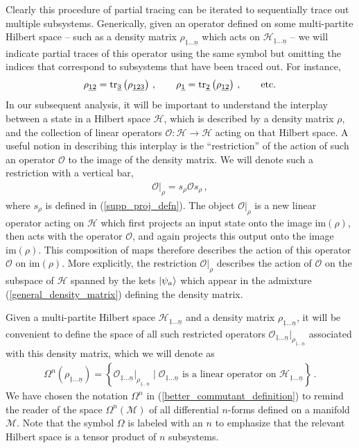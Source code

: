 \documentclass[12pt]{article}
\newcommand{\ul}[1]{{\underline{#1}}}
\newcommand{\im}{\mathrm{im}}
\numberwithin{equation}{section}
\newcommand{\Honeton}{{\mathcal{H}_{\ul{1} \ldots \ul{n}}}}
\begin{document}
Clearly this procedure of partial tracing can be iterated to sequentially trace out multiple subsystems. Generically, given an operator defined on some multi-partite Hilbert space -- such as a density matrix $\rho_{\ul{1} \ldots \ul{n}}$ which acts on $\mathcal{H}_{\ul{1} \ldots \ul{n}}$ -- we will indicate partial traces of this operator using the same symbol but omitting the indices that correspond to subsystems that have been traced out. For instance,
%
\begin{align}
    \rho_{\ul{1} \ul{2}} = \tr_{\ul{3}} \left( \rho_{\ul{1} \ul{2} \ul{3}} \right) \, , \qquad \rho_{\ul{1}} = \tr_{\ul{2}} \left(  \rho_{\ul{1} \ul{2}} \right) \, , \qquad \text{etc.}
\end{align}
%
In our subsequent analysis, it will be important to understand the interplay between a state in a Hilbert space $\mathcal{H}$, which is described by a density matrix $\rho$, and the collection of linear operators $\mathcal{O} : \mathcal{H} \to \mathcal{H}$ acting on that Hilbert space. A useful notion in describing this interplay is the ``restriction'' of the action of such an operator $\mathcal{O}$ to the image of the density matrix. We will denote such a restriction with a vertical bar,
%
\begin{align}\label{restriction}
    \mathcal{O} \big\vert_{\rho} = s_\rho \mathcal{O} s_\rho \, ,
\end{align}
%
where $s_\rho$ is defined in (\ref{supp_proj_defn}). The object $\mathcal{O} \big\vert_{\rho}$ is a new linear operator acting on $\mathcal{H}$ which first projects an input state onto the image $\mathrm{im} ( \rho )$, then acts with the operator $\mathcal{O}$, and again projects this output onto the image $\mathrm{im} ( \rho )$. This composition of maps therefore describes the action of this operator $\mathcal{O}$ on $\im ( \rho )$. More explicitly, the restriction $\mathcal{O} \big\vert_{\rho}$ describes the action of $\mathcal{O}$ on the subspace of $\mathcal{H}$ spanned by the kets $\ket{\psi_a}$ which appear in the admixture (\ref{general_density_matrix}) defining the density matrix.

Given a multi-partite Hilbert space $\Honeton$ and a density matrix $\rho_{\ul{1} \ldots \ul{n}}$, it will be convenient to define the space of all such restricted operators $\mathcal{O}_{\ul{1} \ldots \ul{n}} \big\vert_{\rho_{\ul{1} \ldots \ul{n}}}$ associated with this density matrix, which we will denote as
%
\begin{align}\label{better_commutant_definition}
    \Omega^n \left( \rho_{\ul{1} \ldots \ul{n}} \right) = \left\{ \mathcal{O}_{\ul{1} \ldots \ul{n}} \big\vert_{\rho_{\ul{1} \ldots \ul{n}}} \mid \mathcal{O}_{\ul{1} \ldots \ul{n}} \text{ is a linear operator on } \Honeton \right\} \, .
\end{align}
%
We have chosen the notation $\Omega^n$ in (\ref{better_commutant_definition}) to remind the reader of the space $\Omega^n ( \mathcal{M} )$ of all differential $n$-forms defined on a manifold $\mathcal{M}$. Note that the symbol $\Omega$ is labeled with an $n$ to emphasize that the relevant Hilbert space is a tensor product of $n$ subsystems.
\end{document}

